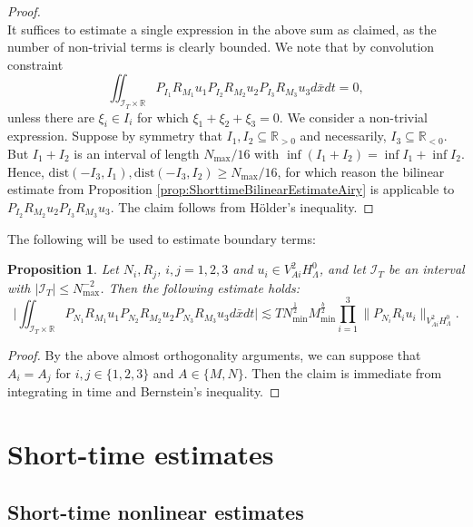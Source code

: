 \documentclass{amsart}
\newtheorem{proposition}[theorem]{Proposition}
\theoremstyle{definition}
\newcommand{\R}{\mathbb{R}}
\begin{document}
\begin{proof}
\begin{equation*}
\end{equation*}
It suffices to estimate a single expression in the above sum as claimed, as the number of non-trivial terms is clearly bounded.
We note that by convolution constraint
\begin{equation*}
\iint_{\mathcal{I}_T \times \R} P_{I_1} R_{M_1} u_1 P_{I_2} R_{M_2} u_2 P_{I_3} R_{M_3} u_3 d\bar{x} dt = 0,
\end{equation*}
unless there are $\xi_i \in I_i$ for which $\xi_1+\xi_2+\xi_3 = 0$. 
We consider a non-trivial expression. Suppose by symmetry that $I_1,I_2 \subseteq \R_{>0}$ and necessarily, $I_3 \subseteq \R_{<0}$. But $I_1+I_2$ is an interval of length $N_{\max}/16$ with $\inf (I_1+I_2) = \inf I_1 + \inf I_2$. Hence, $\text{dist}(-I_3,I_1), \text{dist}(-I_3,I_2) \geq N_{\max} / 16$, for which reason the bilinear estimate from Proposition \ref{prop:ShorttimeBilinearEstimateAiry} is applicable to $P_{I_2} R_{M_2} u_2 P_{I_3} R_{M_3} u_3$. The claim follows from H\"older's inequality.
\end{proof}

The following will be used to estimate boundary terms:
\begin{proposition}
\label{prop:AiryBoundaryTerms}
Let $N_i, R_j$, $i,j=1,2,3$ and $u_i \in V^2_{Ai} H^0_\Lambda$, and let $\mathcal{I}_T$ be an interval with $|\mathcal{I}_T| \leq N_{\max}^{-2}$. Then the following estimate holds:
\begin{equation*}
\big| \iint_{\mathcal{I}_T \times \R} P_{N_1} R_{M_1} u_1 P_{N_2} R_{M_2} u_2 P_{N_3} R_{M_3} u_3 d\bar{x} dt \big| \lesssim T N_{\min}^{\frac{1}{2}} M_{\min}^{\frac{b}{2}} \prod_{i=1}^3 \| P_{N_i} R_i u_i \|_{V^2_{Ai} H^0_\Lambda}.
\end{equation*}
\end{proposition}
\begin{proof}
By the above almost orthogonality arguments, we can suppose that $A_i=A_j$ for $i,j \in \{1,2,3\}$ and $A \in \{M,N\}$. Then the claim is immediate from integrating in time and Bernstein's inequality.
\end{proof}

\section{Short-time estimates}
\label{section:NonlinearEstimates}
\subsection{Short-time nonlinear estimates}
\end{document}
